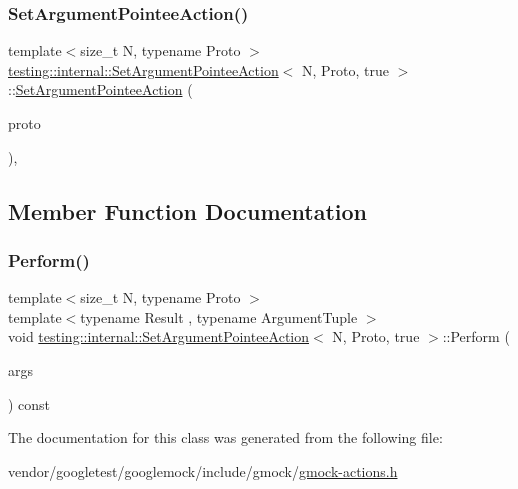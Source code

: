 \subsubsection{\texorpdfstring{Set\+Argument\+Pointee\+Action()}{SetArgumentPointeeAction()}}
{\footnotesize\ttfamily template$<$size\+\_\+t N, typename Proto $>$ \\
\hyperlink{classtesting_1_1internal_1_1_set_argument_pointee_action}{testing\+::internal\+::\+Set\+Argument\+Pointee\+Action}$<$ N, Proto, true $>$\+::\hyperlink{classtesting_1_1internal_1_1_set_argument_pointee_action}{Set\+Argument\+Pointee\+Action} (\begin{DoxyParamCaption}\item[{const Proto \&}]{proto }\end{DoxyParamCaption})\hspace{0.3cm}{\ttfamily [inline]}, {\ttfamily [explicit]}}



\subsection{Member Function Documentation}
\mbox{\label{classtesting_1_1internal_1_1_set_argument_pointee_action_3_01_n_00_01_proto_00_01true_01_4_ac89fa5dde5d2683206a77d29630917cd}} 
\subsubsection{\texorpdfstring{Perform()}{Perform()}}
{\footnotesize\ttfamily template$<$size\+\_\+t N, typename Proto $>$ \\
template$<$typename Result , typename Argument\+Tuple $>$ \\
void \hyperlink{classtesting_1_1internal_1_1_set_argument_pointee_action}{testing\+::internal\+::\+Set\+Argument\+Pointee\+Action}$<$ N, Proto, true $>$\+::Perform (\begin{DoxyParamCaption}\item[{const Argument\+Tuple \&}]{args }\end{DoxyParamCaption}) const\hspace{0.3cm}{\ttfamily [inline]}}



The documentation for this class was generated from the following file\+:\begin{DoxyCompactItemize}
\item 
vendor/googletest/googlemock/include/gmock/\hyperlink{gmock-actions_8h}{gmock-\/actions.\+h}\end{DoxyCompactItemize}
